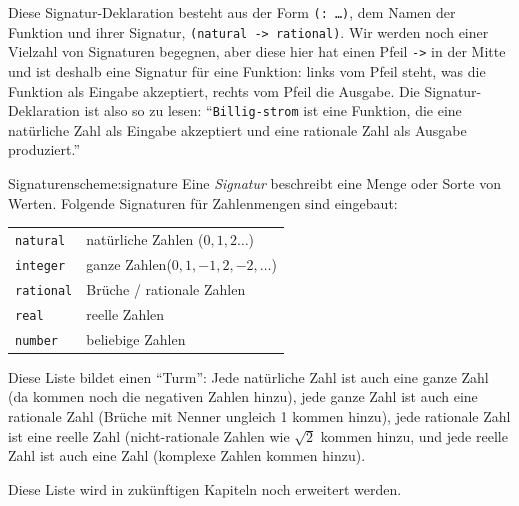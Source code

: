 Diese Signatur-Deklaration besteht aus der Form \texttt{(: \ldots)},
dem Namen der Funktion und ihrer Signatur, \texttt{(natural ->
  rational)}.  Wir werden noch einer Vielzahl von Signaturen begegnen,
aber diese hier hat einen Pfeil \texttt{->} in der Mitte und ist
deshalb eine Signatur für eine Funktion: links vom Pfeil steht, was
die Funktion als Eingabe akzeptiert, rechts vom Pfeil die Ausgabe. Die
Signatur-Deklaration ist also so zu lesen: "`\texttt{Billig-strom} ist
eine Funktion, die eine natürliche Zahl als Eingabe akzeptiert und
eine rationale Zahl als Ausgabe produziert."'

\begin{feature}{Signaturen}{scheme:signature}
  Eine \textit{Signatur} beschreibt eine Menge oder
  Sorte von Werten.  Folgende Signaturen für Zahlenmengen sind
  eingebaut:
  \begin{flushleft}
    \begin{tabular}{ll}
      \texttt{natural\index{natural@\texttt{natural}}} & natürliche
                                                         Zahlen\index{natürliche
                                                         Zahlen} ($0, 1, 2\ldots$)\\
      \texttt{integer\index{integer@\texttt{integer}}} & ganze
                                                         Zahlen\index{ganze
                                                         Zahlen}($0, 1, -1, 2, -2, \ldots$)\\
      \texttt{rational\index{rational@\texttt{rational}}} &
                                                            Brüche\index{Bruch} / rationale Zahlen\index{rationale Zahlen} \\
      \texttt{real\index{real@\texttt{real}}} & reelle
                                                Zahlen\index{reelle Zahlen}\\
      \texttt{number\index{number@\texttt{number}}} & beliebige Zahlen
    \end{tabular}
  \end{flushleft}
  Diese Liste bildet einen "`Turm"': Jede natürliche Zahl ist auch eine
  ganze Zahl (da kommen noch die negativen Zahlen hinzu), jede ganze
  Zahl ist auch eine rationale Zahl (Brüche mit Nenner ungleich 1
  kommen hinzu), jede rationale Zahl ist eine reelle Zahl
  (nicht-rationale Zahlen wie $\sqrt{2}$ kommen hinzu, und jede reelle
  Zahl ist auch eine Zahl (komplexe Zahlen kommen hinzu).
  
  Diese Liste wird in zukünftigen Kapiteln noch erweitert werden.


\end{feature}
